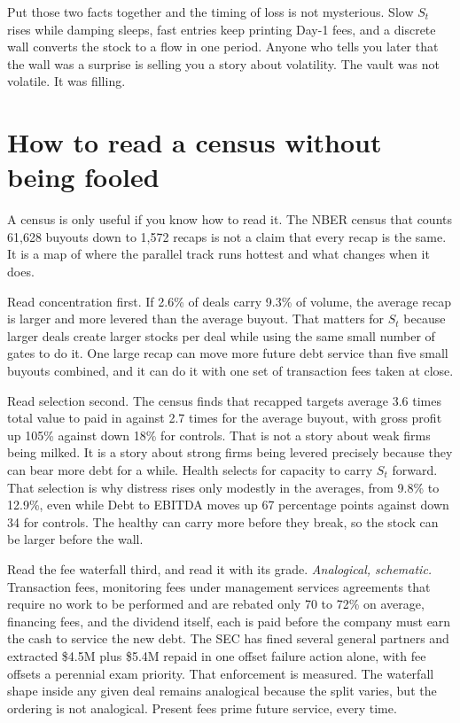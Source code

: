 Put those two facts together and the timing of loss is not mysterious. Slow $S_t$ rises while damping sleeps, fast entries keep printing Day-1 fees, and a discrete wall converts the stock to a flow in one period. Anyone who tells you later that the wall was a surprise is selling you a story about volatility. The vault was not volatile. It was filling.

\section{How to read a census without being fooled}

A census is only useful if you know how to read it. The NBER census that counts 61,628 buyouts down to 1,572 recaps is not a claim that every recap is the same. It is a map of where the parallel track runs hottest and what changes when it does.

Read concentration first. If 2.6\% of deals carry 9.3\% of volume, the average recap is larger and more levered than the average buyout. That matters for $S_t$ because larger deals create larger stocks per deal while using the same small number of gates to do it. One large recap can move more future debt service than five small buyouts combined, and it can do it with one set of transaction fees taken at close.

Read selection second. The census finds that recapped targets average 3.6 times total value to paid in against 2.7 times for the average buyout, with gross profit up 105\% against down 18\% for controls. That is not a story about weak firms being milked. It is a story about strong firms being levered precisely because they can bear more debt for a while. Health selects for capacity to carry $S_t$ forward. That selection is why distress rises only modestly in the averages, from 9.8\% to 12.9\%, even while Debt to EBITDA moves up 67 percentage points against down 34 for controls. The healthy can carry more before they break, so the stock can be larger before the wall.

Read the fee waterfall third, and read it with its grade. \textit{Analogical, schematic.} Transaction fees, monitoring fees under management services agreements that require no work to be performed and are rebated only 70 to 72\% on average, financing fees, and the dividend itself, each is paid before the company must earn the cash to service the new debt. The SEC has fined several general partners and extracted \$4.5M plus \$5.4M repaid in one offset failure action alone, with fee offsets a perennial exam priority. That enforcement is measured. The waterfall shape inside any given deal remains analogical because the split varies, but the ordering is not analogical. Present fees prime future service, every time.

